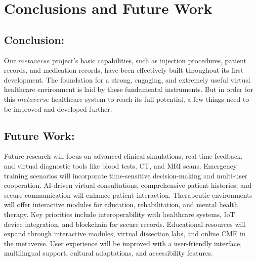 \chapter{Conclusions and Future Work}
\section{Conclusion:}
Our $metaverse$ project's basic capabilities, such as injection procedures, patient records, and medication records, have been effectively built throughout its first development. The foundation for a strong, engaging, and extremely useful virtual healthcare environment is laid by these fundamental instruments. But in order for this $metaverse$ healthcare system to reach its full potential, a few things need to be improved and developed further.
\section{Future Work:}
Future research will focus on advanced clinical simulations, real-time feedback, and virtual diagnostic tools like blood tests, CT, and MRI scans. Emergency training scenarios will incorporate time-sensitive decision-making and multi-user cooperation. AI-driven virtual consultations, comprehensive patient histories, and secure communication will enhance patient interaction. Therapeutic environments will offer interactive modules for education, rehabilitation, and mental health therapy. Key priorities include interoperability with healthcare systems, IoT device integration, and blockchain for secure records. Educational resources will expand through interactive modules, virtual dissection labs, and online CME in the metaverse. User experience will be improved with a user-friendly interface, multilingual support, cultural adaptations, and accessibility features.
